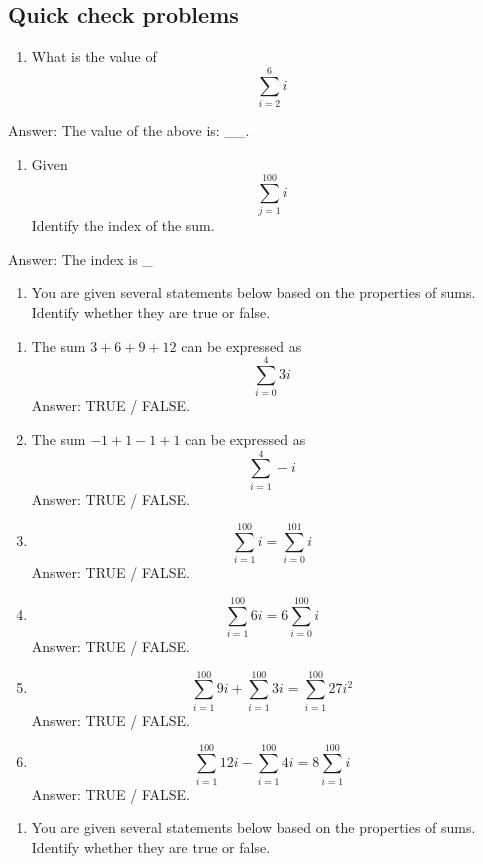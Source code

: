 \documentclass[
  12pt,
  a4paper, oneside]{starmastarticle}
\providecommand{\tightlist}{%
  \setlength{\itemsep}{0pt}\setlength{\parskip}{0pt}}\usepackage{longtable,booktabs,array}
\begin{document}
\hypertarget{quick-check-problems}{%
\subsection*{Quick check problems}\label{quick-check-problems}}

\begin{enumerate}
\def\labelenumi{\arabic{enumi}.}
\tightlist
\item
  What is the value of \[\sum_{i = 2}^{6} i\]
\end{enumerate}

Answer: The value of the above is: \_\_.

\begin{enumerate}
\def\labelenumi{\arabic{enumi}.}
\setcounter{enumi}{1}
\tightlist
\item
  Given \[\sum_{j = 1}^{100} i\] Identify the index of the sum.
\end{enumerate}

Answer: The index is \_

\begin{enumerate}
\def\labelenumi{\arabic{enumi}.}
\setcounter{enumi}{2}
\tightlist
\item
  You are given several statements below based on the properties of
  sums. Identify whether they are true or false.
\end{enumerate}

\begin{enumerate}
\def\labelenumi{(\alph{enumi})}
\item
  The sum \(3 + 6 + 9 + 12\) can be expressed as \[\sum_{i = 0}^{4} 3i\]
  Answer: TRUE / FALSE.
\item
  The sum \(-1 + 1 - 1 + 1\) can be expressed as \[\sum_{i = 1}^{4} -i\]
  Answer: TRUE / FALSE.
\item
  \[\sum_{i = 1}^{100} i = \sum_{i = 0}^{101} i\] Answer: TRUE / FALSE.
\item
  \[\sum_{i = 1}^{100} 6i = 6 \sum_{i = 0}^{100} i\] Answer: TRUE /
  FALSE.
\item
  \[\sum_{i = 1}^{100} 9i + \sum_{i = 1}^{100} 3i = \sum_{i = 1}^{100} 27i^2\]
  Answer: TRUE / FALSE.
\item
  \[\sum_{i = 1}^{100} 12i - \sum_{i = 1}^{100} 4i = 8 \sum_{i = 1}^{100} i\]
  Answer: TRUE / FALSE.
\end{enumerate}

\begin{enumerate}
\def\labelenumi{\arabic{enumi}.}
\setcounter{enumi}{3}
\tightlist
\item
  You are given several statements below based on the properties of
  sums. Identify whether they are true or false.
\end{enumerate}
\end{document}
